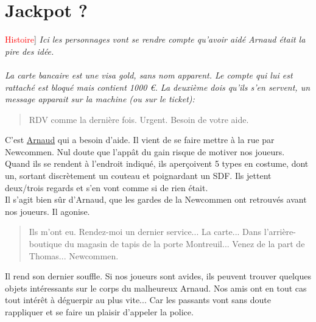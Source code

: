 \documentclass[10pt,a4paper,twocolumn]{article}
\newenvironment{lAbstract}[1]{{[}\textcolor{red}{#1}{]}\itshape}{\\ \\}
\begin{document}
\section{Jackpot ?}
\begin{lAbstract}{Histoire}
Ici les personnages vont se rendre compte qu'avoir aidé Arnaud était la pire des idée.
\end{lAbstract}
La carte bancaire est une visa gold, sans nom apparent. Le compte qui lui est rattaché est bloqué mais contient 1000 €. La deuxième dois qu'ils s'en servent, un message apparait sur la machine (ou sur le ticket): 
\begin{quote}
RDV comme la dernière fois. Urgent. Besoin de votre aide.
\end{quote}
C'est \hyperlink{arnaud}{Arnaud} qui a besoin d'aide. Il vient de se faire mettre à la rue par Newcommen. Nul doute que l'appât du gain risque de motiver nos joueurs. \\
Quand ils se rendent à l'endroit indiqué, ils aperçoivent 5 types en costume, dont un, sortant discrètement un couteau et poignardant un SDF. Ils jettent deux/trois regards et s'en vont comme si de rien était.
\\
Il s'agit bien sûr d'Arnaud, que les gardes de la Newcommen ont retrouvés avant nos joueurs. Il agonise.
\begin{quote}
Ils m'ont eu. Rendez-moi un dernier service... La carte... Dans l'arrière-boutique du magasin de tapis de la porte Montreuil... Venez de la part de Thomas... Newcommen.
\end{quote}
Il rend son dernier souffle.
Si nos joueurs sont avides, ils peuvent trouver quelques objets intéressants sur le corps du malheureux Arnaud.
Nos amis ont en tout cas tout intérêt à déguerpir au plus vite... Car les passants vont sans doute rappliquer et se faire un plaisir d'appeler la police.
\end{document}
